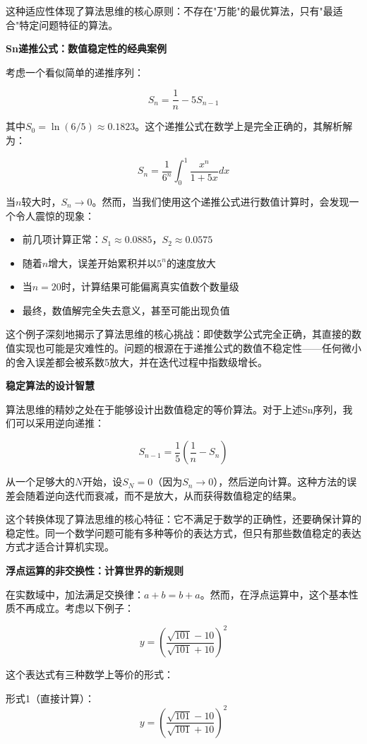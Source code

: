 这种适应性体现了算法思维的核心原则：不存在"万能"的最优算法，只有"最适合"特定问题特征的算法。

\textbf{Sn递推公式：数值稳定性的经典案例}

考虑一个看似简单的递推序列：

$$S_n = \frac{1}{n} - 5S_{n-1}$$

其中$S_0 = \ln(6/5) \approx 0.1823$。这个递推公式在数学上是完全正确的，其解析解为：

$$S_n = \frac{1}{6^n} \int_0^1 \frac{x^n}{1+5x} dx$$

当$n$较大时，$S_n \to 0$。然而，当我们使用这个递推公式进行数值计算时，会发现一个令人震惊的现象：

\begin{itemize}
\item 前几项计算正常：$S_1 \approx 0.0885$，$S_2 \approx 0.0575$
\item 随着$n$增大，误差开始累积并以$5^n$的速度放大
\item 当$n=20$时，计算结果可能偏离真实值数个数量级
\item 最终，数值解完全失去意义，甚至可能出现负值
\end{itemize}

这个例子深刻地揭示了算法思维的核心挑战：即使数学公式完全正确，其直接的数值实现也可能是灾难性的。问题的根源在于递推公式的数值不稳定性——任何微小的舍入误差都会被系数5放大，并在迭代过程中指数级增长。

\textbf{稳定算法的设计智慧}

算法思维的精妙之处在于能够设计出数值稳定的等价算法。对于上述Sn序列，我们可以采用逆向递推：

$$S_{n-1} = \frac{1}{5}\left(\frac{1}{n} - S_n\right)$$

从一个足够大的$N$开始，设$S_N = 0$（因为$S_n \to 0$），然后逆向计算。这种方法的误差会随着逆向迭代而衰减，而不是放大，从而获得数值稳定的结果。

这个转换体现了算法思维的核心特征：它不满足于数学的正确性，还要确保计算的稳定性。同一个数学问题可能有多种等价的表达方式，但只有那些数值稳定的表达方式才适合计算机实现。

\textbf{浮点运算的非交换性：计算世界的新规则}

在实数域中，加法满足交换律：$a + b = b + a$。然而，在浮点运算中，这个基本性质不再成立。考虑以下例子：

$$y = \left(\frac{\sqrt{101} - 10}{\sqrt{101} + 10}\right)^2$$

这个表达式有三种数学上等价的形式：

形式1（直接计算）：
$$y = \left(\frac{\sqrt{101} - 10}{\sqrt{101} + 10}\right)^2$$

